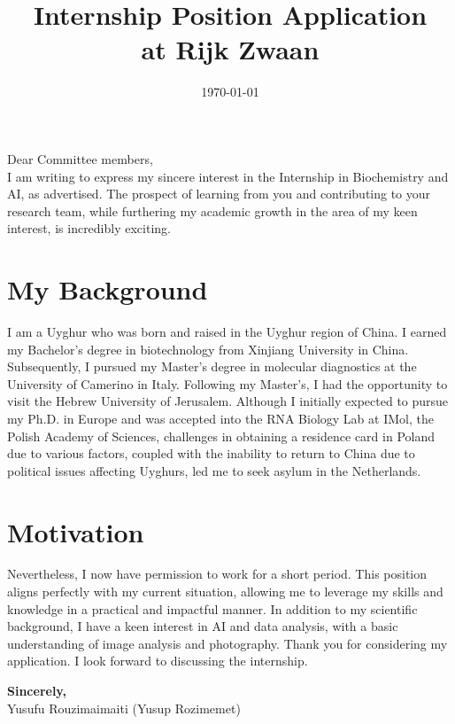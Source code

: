 \documentclass{article}
\title{\textcolor{myblue}{Internship Position Application \\[2ex] \large at Rijk Zwaan}}
\author{}
\date{\textcolor{myblue}{\today}}
\begin{document}
\maketitle

Dear Committee members,
\\[3pt]

I am writing to express my sincere interest in the Internship in Biochemistry and AI, as advertised. The prospect of learning from you and contributing to your research team, while furthering my academic growth in the area of my keen interest, is incredibly exciting.

\section*{My Background}

I am a Uyghur who was born and raised in the Uyghur region of China. I earned my Bachelor's degree in biotechnology from Xinjiang University in China. Subsequently, I pursued my Master's degree in molecular diagnostics at the University of Camerino in Italy. Following my Master's, I had the opportunity to visit the Hebrew University of Jerusalem. Although I initially expected to pursue my Ph.D. in Europe and was accepted into the RNA Biology Lab at IMol, the Polish Academy of Sciences, challenges in obtaining a residence card in Poland due to various factors, coupled with the inability to return to China due to political issues affecting Uyghurs, led me to seek asylum in the Netherlands.

\section*{Motivation}
Nevertheless, I now have permission to work for a short period. This position aligns perfectly with my current situation, allowing me to leverage my skills and knowledge in a practical and impactful manner. In addition to my scientific background, I have a keen interest in AI and data analysis, with a basic understanding of image analysis and photography. Thank you for considering my application. I look forward to discussing the internship.

\textbf{Sincerely,}
\\[15pt]
\textcolor{myblue}{Yusufu Rouzimaimaiti (Yusup Rozimemet)\\
}
\end{document}
